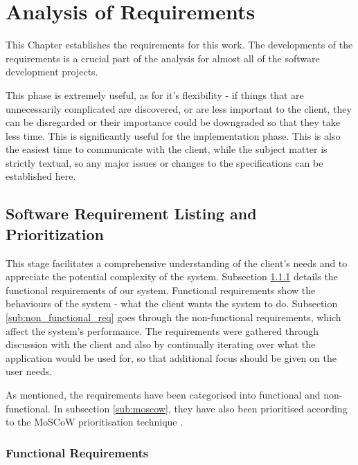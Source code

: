 \chapter{Analysis of Requirements}
\label{chapterlabel3}


This Chapter establishes the requirements for this work. The developments of the requirements is a crucial part of the analysis for almost all of the software development projects.

This phase is extremely useful, as for it's flexibility - if things that are unnecessarily complicated are discovered, or are less important to the client, they can be disregarded  or their importance could be downgraded so that they take less time. This is significantly useful for the implementation phase. This is also the easiest time to communicate with the client, while the subject matter is strictly textual, so any major issues or changes to the specifications can be established here.



\section{Software Requirement Listing and Prioritization}
\label{sec:softreqlistandprior} 

This stage facilitates a comprehensive understanding of the client's needs and to appreciate the potential complexity of the system. Subsection \ref{sub:functional_req} details the functional requirements of our system.  Functional requirements show the behaviours of the system - what the client wants the system to do.  Subsection \ref{sub:non_functional_req} goes through the non-functional requirements, which affect the system's performance. 
The requirements were gathered through discussion with the client and also by continually iterating over what the application would be used for, so that additional focus should be given on the user needs.


 As mentioned, the requirements have been categorised into functional and non-functional. In subsection \ref{sub:moscow}, they have also been prioritised according to the MoSCoW prioritisation technique \cite{cleggbarker1994}.


\subsection{Functional Requirements}
\label{sub:functional_req}

